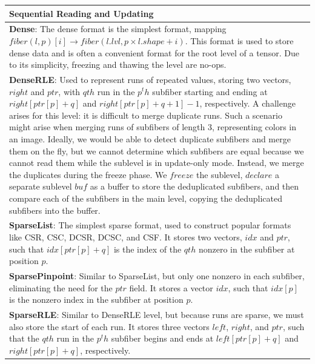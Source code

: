 \begin{table}[ht]
    \centering
    \scriptsize
    \begin{tabular}{p{14cm}}

    \hline
    \textbf{Sequential Reading and Updating} \\
    \hline
    \textbf{Dense}:
    The dense format is the simplest format, mapping $fiber(l, p)[i] \rightarrow fiber(l.lvl, p \times l.shape + i)$.
    This format is used to store dense data and is often a convenient format for the root level of a tensor.
    Due to its simplicity, freezing and thawing the level are no-ops. \\
    \textbf{DenseRLE}:
    Used to represent runs of repeated values, storing two vectors, $right$ and $ptr$, with $qth$ run in the $p^th$ subfiber starting and ending at $right[ptr[p] + q]$ and $right[ptr[p] + q + 1] - 1$, respectively.
    A challenge arises for this level: it is difficult to merge duplicate runs.
    Such a scenario might arise when merging runs of subfibers of length 3, representing colors in an image.
    Ideally, we would be able to detect duplicate subfibers and merge them on the fly, but we cannot determine which subfibers are equal because we cannot read them while the sublevel is in update-only mode.
    Instead, we merge the duplicates during the freeze phase.
    We $freeze$ the sublevel, $declare$ a separate sublevel $buf$ as a buffer to store the deduplicated subfibers, and then compare each of the subfibers in the main level, copying the deduplicated subfibers into the buffer. \\
    \textbf{SparseList}:
    The simplest sparse format, used to construct popular formats like CSR, CSC, DCSR, DCSC, and CSF.
    It stores two vectors, $idx$ and $ptr$, such that $idx[ptr[p] + q]$ is the index of the $qth$ nonzero in the subfiber at position $p$. \\
    \textbf{SparsePinpoint}:
    Similar to SparseList, but only one nonzero in each subfiber, eliminating the need for the $ptr$ field.
    It stores a vector $idx$, such that $idx[p]$ is the nonzero index in the subfiber at position $p$. \\
    \textbf{SparseRLE}:
    Similar to DenseRLE level, but because runs are sparse, we must also store the start of each run.
    It stores three vectors $left$, $right$, and $ptr$, such that the $qth$ run in the $p^th$ subfiber begins and ends at $left[ptr[p] + q]$ and $right[ptr[p] + q]$, respectively.

\end{tabular}
\end{table}
